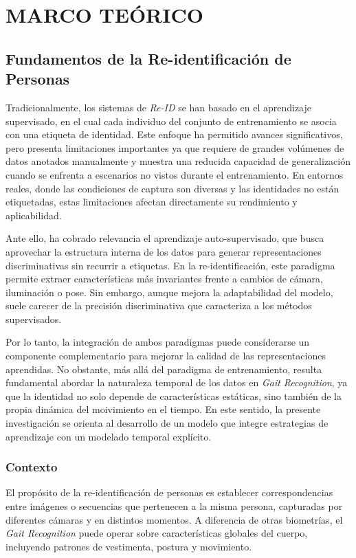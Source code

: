 \chapter{MARCO TEÓRICO}

\section{Fundamentos de la Re-identificación de Personas}

Tradicionalmente, los sistemas de \textit{Re-ID} se han basado en el aprendizaje supervisado, en el cual cada individuo del conjunto de entrenamiento se asocia con una etiqueta de identidad. Este enfoque ha permitido avances significativos, pero presenta limitaciones importantes ya que requiere de grandes volúmenes de datos anotados manualmente y muestra una reducida capacidad de generalización cuando se enfrenta a escenarios no vistos durante el entrenamiento. En entornos reales, donde las condiciones de captura son diversas y las identidades no están etiquetadas, estas limitaciones afectan directamente su rendimiento y aplicabilidad.

Ante ello, ha cobrado relevancia el aprendizaje auto-supervisado, que busca aprovechar la estructura interna de los datos para generar representaciones discriminativas sin recurrir a etiquetas. En la re-identificación, este paradigma permite extraer características más invariantes frente a cambios de cámara, iluminación o pose. Sin embargo, aunque mejora la adaptabilidad del modelo, suele carecer de la precisión discriminativa que caracteriza a los métodos supervisados.

Por lo tanto, la integración de ambos paradigmas puede considerarse un componente complementario para mejorar la calidad de las representaciones aprendidas. No obstante, más allá del paradigma de entrenamiento, resulta fundamental abordar la naturaleza temporal de los datos en \textit{Gait Recognition}, ya que la identidad no solo depende de características estáticas, sino también de la propia dinámica del moivimiento en el tiempo. En este sentido, la presente investigación se orienta al desarrollo de un modelo que integre estrategias de aprendizaje con un modelado temporal explícito. 

\subsection{Contexto}

El propósito de la re-identificación de personas es establecer correspondencias entre imágenes o secuencias que pertenecen a la misma persona, capturadas por diferentes cámaras y en distintos momentos. A diferencia de otras biometrías, el \textit{Gait Recognition} puede operar sobre características globales del cuerpo, incluyendo patrones de vestimenta, postura y movimiento.

